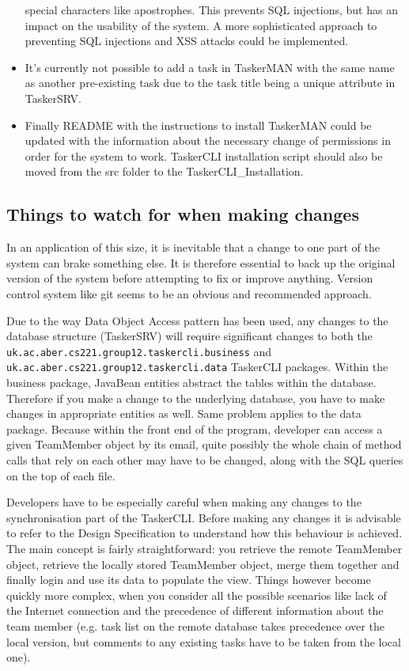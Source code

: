 \documentclass{project}
\begin{document}
\begin{itemize}
    special characters like apostrophes. This prevents SQL injections, but has an impact
    on the usability of the system. A more sophisticated approach to preventing SQL injections
    and XSS attacks could be implemented.
  \item It's currently not possible to add a task in TaskerMAN with the same name as another pre-existing task due to the task title being a unique attribute in TaskerSRV.
  \item Finally README with the instructions to install TaskerMAN could be updated with
    the information about the necessary change of permissions in order for the system
    to work. TaskerCLI installation script should also be moved from the src folder 
    to the TaskerCLI\_Installation. 
\end{itemize}

\subsection{Things to watch for when making changes}
In an application of this size, it is inevitable that a change to one part of the system
can brake something else. It is therefore essential to back up the original
version of the system before attempting to fix or improve anything. Version control 
system like git seems to be an obvious and recommended approach.

Due to the way Data Object Access pattern has been used, any changes to the database
structure (TaskerSRV) will require significant changes to both the 
\texttt{uk.ac.aber.cs221.group12.taskercli.business} and 
\texttt{uk.ac.aber.cs221.group12.taskercli.data} TaskerCLI packages. Within the business
package, JavaBean entities abstract the tables within the database. Therefore if you
make a change to the underlying database, you have to make changes in appropriate 
entities as well. Same problem applies to the data package. Because within the front end
of the program, developer can access a given TeamMember object by its email, quite
possibly the whole chain of method calls that rely on each other may have to be changed,
along with the SQL queries on the top of each file. 

Developers have to be especially careful when making any changes to the synchronisation
part of the TaskerCLI. Before making any changes it is advisable to refer to the
Design Specification\cite{se.qa.rs} to understand how this behaviour
is achieved. The main concept is fairly straightforward: you retrieve the remote TeamMember
object, retrieve the locally stored TeamMember object, merge them together and finally 
login and use its data to populate the view. Things however become quickly more complex, when
you consider all the possible scenarios like lack of the Internet connection and the precedence
of different information about the team member (e.g. task list on the remote database takes
precedence over the local version, but comments to any existing tasks have to be taken
from the local one).
\end{document}
